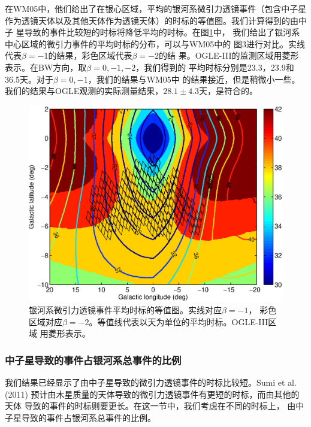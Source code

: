 在WM05中，他们给出了在银心区域，平均的银河系微引力透镜事件（包含中子星
作为透镜天体以及其他天体作为透镜天体）的时标的等值图。我们计算得到的由中子
星导致的事件比较短的时标将降低平均的时标。在图\ref{map_timescale}中，
我们给出了银河系中心区域的微引力事件的平均时标的分布，可以与WM05中的
图3进行对比。实线代表$\beta=-1$的结果，彩色区域代表$\beta=-2$的结
果。OGLE-III的监测区域用菱形表示。在BW方向，取$\beta=0,-1,-2$，我们得到的
平均时标分别是23.3，23.9和36.5天。对于$\beta=0,-1$，我们的结果与WM05中
的结果接近，但是稍微小一些。我们的结果与OGLE观测的实际测量结果，$28.1\pm4.3$天\supercite{sumi}，是符合的。

%
\begin{figure}
\begin{center}
  \includegraphics[width=4 in,trim=0 0 0 3cm]{map_timescale.eps}
%
\caption{银河系微引力透镜事件平均时标的等值图。实线对应$\beta=-1$，
彩色区域对应$\beta=-2$。等值线代表以天为单位的平均时标。OGLE-III区域
用菱形表示。}
\label{map_timescale}
\end{center}
\end{figure}
%

\subsubsection{中子星导致的事件占银河系总事件的比例}

我们结果已经显示了由中子星导致的微引力透镜事件的时标比较短。Sumi et al. (2011)\supercite{sumi11}
预计由木星质量的天体导致的微引力透镜事件有更短的时标，而由其他的天体
导致的事件的时标则要更长。在这一节中，我们考虑在不同的时标上，
由中子星导致的事件占银河系总事件的比例。

